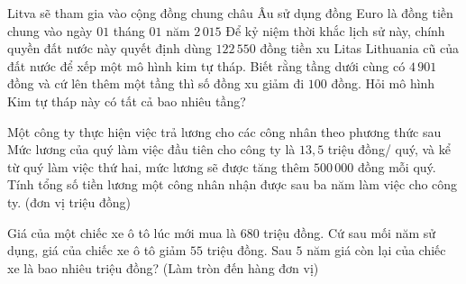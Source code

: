 \begin{ex}%
	Litva sẽ tham gia vào  cộng đồng chung châu Âu sử dụng đồng Euro là đồng tiền chung vào ngày $01$ tháng $01$ năm $2\,015$ Để kỷ niệm thời khắc lịch sử này, chính quyền đất nước này quyết định dùng $122\,550$ đồng tiền xu Litas Lithuania cũ của đất nước để xếp một mô hình kim tự tháp. Biết rằng tầng dưới cùng có $4\,901$ đồng và cứ lên thêm một tầng thì số đồng xu giảm đi $100$ đồng. Hỏi mô hình Kim tự tháp này có tất cả bao nhiêu tầng?
\end{ex}

\begin{ex}%
	Một công ty thực hiện việc trả lương cho các công nhân theo phương thức sau Mức lương của quý làm việc đầu tiên cho công ty là $13{,}5$ triệu đồng/ quý, và kể từ quý làm việc thứ hai, mức lương sẽ  được tăng thêm $500\, 000$ đồng mỗi quý. Tính tổng số tiền lương một công nhân nhận được sau ba năm làm việc cho công ty. (đơn vị triệu đồng)
\end{ex}

\begin{ex}%
	Giá của một chiếc xe ô tô lúc mới mua là $680$ triệu đồng. Cứ sau mối năm sử dụng, giá của chiếc xe ô tô giảm $55$ triệu đồng. Sau $5$ năm giá còn lại của chiếc xe là bao nhiêu triệu đồng? (Làm  tròn đến hàng đơn vị)
\end{ex}

